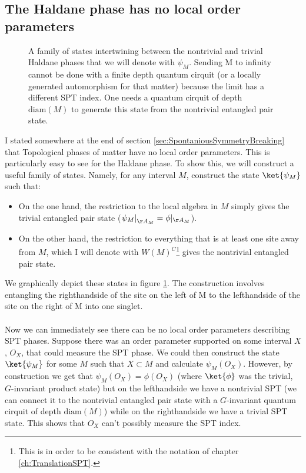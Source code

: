 \subsection{The Haldane phase has no local order parameters}\label{sec:the-haldane-phase-has-no-local-order-parameters}
\begin{figure}
	\begin{center}
		
	\end{center}
	
	\caption{A family of states intertwining between the nontrivial and trivial Haldane phases that we will denote with $\psi_M$. Sending M to infinity cannot be done with a finite depth quantum cirquit (or a locally generated automorphism for that matter) because the limit has a different SPT index. One needs a quantum cirquit of depth $\textrm{diam}(M)$ to generate this state from the nontrivial entangled pair state.}
	\label{fig:FamilyOfStatesBetweenTrivialAndNontrivialEntangledPair}
\end{figure}
I stated somewhere at the end of section \ref{sec:SpontaniousSymmetryBreaking} that Topological phases of matter have no local order parameters. This is particularly easy to see for the Haldane phase. To show this, we will construct a useful family of states. Namely, for any interval $M$, construct the state $\ket{\psi_M}$ such that:
\begin{itemize}
	\item On the one hand, the restriction to the local algebra in $M$ simply gives the trivial entangled pair state ($\left.\psi_M\right|_{\AA_M}=\phi|_{\AA_M}$).
	\item On the other hand, the restriction to everything that is at least one site away from $M$, which I will denote with $W(M)^C$\footnote{This is in order to be consistent with the notation of chapter \ref{ch:TranslationSPT}.} gives the nontrivial entangled pair state.
\end{itemize}
We graphically depict these states in figure \ref{fig:FamilyOfStatesBetweenTrivialAndNontrivialEntangledPair}. The construction involves entangling the righthandside of the site on the left of M to the lefthandside of the site on the right of M into one singlet.
\\\\
Now we can immediately see there can be no local order parameters describing SPT phases. Suppose there was an order parameter supported on some interval $X$, $O_X$, that could measure the SPT phase. We could then construct the state $\ket{\psi_M}$ for some $M$ such that $X\subset M$ and calculate $\psi_M(O_X)$. However, by construction we get that $\psi_M(O_X)=\phi(O_X)$ (where $\ket{\phi}$ was the trivial, $G$-invariant product state) but on the lefthandside we have a nontrivial SPT (we can connect it to the nontrivial entangled pair state with a $G$-invariant quantum cirquit of depth $\textrm{diam}(M)$) while on the righthandside we have a trivial SPT state. This shows that $O_X$ can't possibly measure the SPT index.
